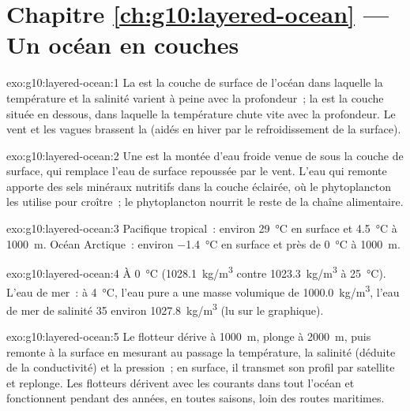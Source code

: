 \section*{Chapitre \ref{ch:g10:layered-ocean} --- Un océan en couches}

\begin{solution}{exo:g10:layered-ocean:1}
La  est la couche de surface de l'océan dans laquelle la
température et la salinité varient à peine avec la profondeur~; la
 est la couche située en dessous, dans laquelle la température
chute vite avec la profondeur. Le vent et les vagues brassent la  (aidés en hiver par le refroidissement de la surface).
\end{solution}

\begin{solution}{exo:g10:layered-ocean:2}
Une  est la montée d'eau froide venue de sous la couche de
surface, qui remplace l'eau de surface repoussée par le vent. L'eau qui
remonte apporte des sels minéraux nutritifs dans la couche éclairée, où le
phytoplancton les utilise pour croître~; le phytoplancton nourrit le reste
de la chaîne alimentaire.
\end{solution}

\begin{solution}{exo:g10:layered-ocean:3}
Pacifique tropical~: environ \qty{29}{\degreeCelsius} en surface et
\qty{4.5}{\degreeCelsius} à \qty{1000}{m}. Océan Arctique~: environ
\qty{-1.4}{\degreeCelsius} en surface et près de \qty{0}{\degreeCelsius} à
\qty{1000}{m}.
\end{solution}

\begin{solution}{exo:g10:layered-ocean:4}
À \qty{0}{\degreeCelsius} (\qty{1028.1}{kg/m^3} contre \qty{1023.3}{kg/m^3}
à \qty{25}{\degreeCelsius}). L'eau de mer~: à \qty{4}{\degreeCelsius}, l'eau
pure a une masse volumique de \qty{1000.0}{kg/m^3}, l'eau de mer de
salinité 35 environ \qty{1027.8}{kg/m^3} (lu sur le graphique).
\end{solution}

\begin{solution}{exo:g10:layered-ocean:5}
Le flotteur dérive à \qty{1000}{m}, plonge à \qty{2000}{m}, puis remonte à
la surface en mesurant au passage la température, la salinité (déduite de
la conductivité) et la pression~; en surface, il transmet son profil par
satellite et replonge. Les flotteurs dérivent avec les courants dans tout
l'océan et fonctionnent pendant des années, en toutes saisons, loin des
routes maritimes.
\end{solution}

